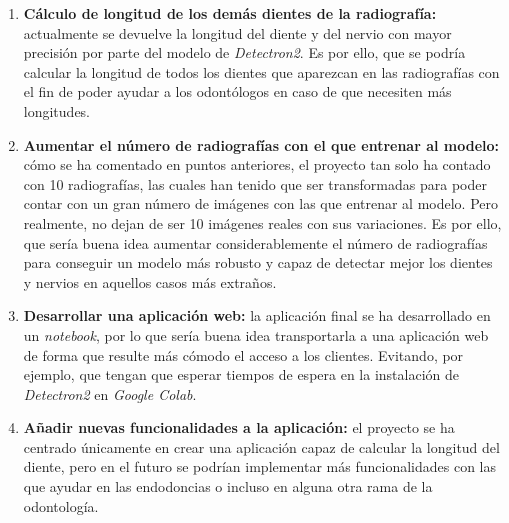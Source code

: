 \begin{enumerate}
    \item \textbf{Cálculo de longitud de los demás dientes de la radiografía:} actualmente se devuelve la longitud del diente y del nervio con mayor precisión por parte del modelo de \emph{Detectron2}. Es por ello, que se podría calcular la longitud de todos los dientes que aparezcan en las radiografías con el fin de poder ayudar a los odontólogos en caso de que necesiten más longitudes.
    
    \item \textbf{Aumentar el número de radiografías con el que entrenar al modelo:} cómo se ha comentado en puntos anteriores, el proyecto tan solo ha contado con 10 radiografías, las cuales han tenido que ser transformadas para poder contar con un gran número de imágenes con las que entrenar al modelo. Pero realmente, no dejan de ser 10 imágenes reales con sus variaciones. Es por ello, que sería buena idea aumentar considerablemente el número de radiografías para conseguir un modelo más robusto y capaz de detectar mejor los dientes y nervios en aquellos casos más extraños.
    
    \item \textbf{Desarrollar una aplicación web:} la aplicación final se ha desarrollado en un \emph{notebook}, por lo que sería buena idea transportarla a una aplicación web de forma que resulte más cómodo el acceso a los clientes. Evitando, por ejemplo, que tengan que esperar tiempos de espera en la instalación de \emph{Detectron2} en \emph{Google Colab}.
    
    \item \textbf{Añadir nuevas funcionalidades a la aplicación:} el proyecto se ha centrado únicamente en crear una aplicación capaz de calcular la longitud del diente, pero en el futuro se podrían implementar más funcionalidades con las que ayudar en las endodoncias o incluso en alguna otra rama de la odontología.
\end{enumerate}
